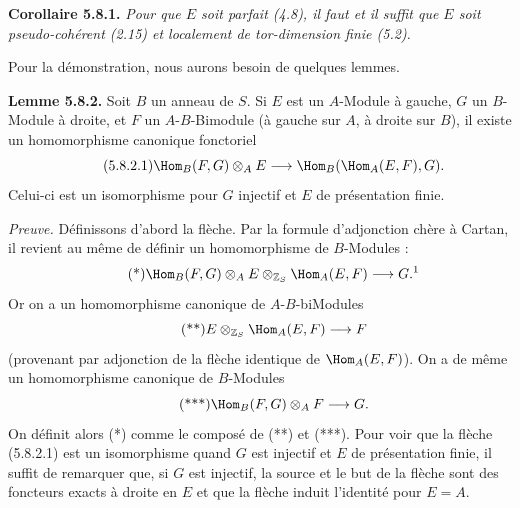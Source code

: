 \textbf{Corollaire 5.8.1.} \emph{Pour que \(E\) soit parfait (4.8), il faut et il suffit que \(E\) soit pseudo-cohérent (2.15) et localement de tor-dimension finie (5.2).}

Pour la démonstration, nous aurons besoin de quelques lemmes.

\textbf{Lemme 5.8.2.} Soit \(B\) un anneau de \(S\). Si \(E\) est un \(A\)-Module à gauche, \(G\) un \(B\)-Module à droite, et \(F\) un \(A\)-\(B\)-Bimodule (à gauche sur \(A\), à droite sur \(B\)), il existe un homomorphisme canonique fonctoriel
\begin{equation}\tag{5.8.2.1}
  \Hom_B(F,G)\otimes_A E
  \longrightarrow
  \Hom_B(\Hom_A(E,F),G).
\end{equation}
Celui-ci est un isomorphisme pour \(G\) injectif et \(E\) de présentation finie.

\emph{Preuve.} Définissons d'abord la flèche. Par la formule d'adjonction chère à Cartan, il revient au même de définir un homomorphisme de \(B\)-Modules :
\begin{equation}\tag{*}
  \Hom_B(F,G)\otimes_A E\otimes_{\mathbb Z_S}\Hom_A(E,F)
  \longrightarrow G.\text{\footnotemark}
\end{equation}
Or on a un homomorphisme canonique de \(A\)-\(B\)-biModules
\begin{equation}\tag{**}
  E\otimes_{\mathbb Z_S}\Hom_A(E,F)
  \longrightarrow F
\end{equation}
(provenant par adjonction de la flèche identique de \(\Hom_A(E,F)\)). On a de même un homomorphisme canonique de \(B\)-Modules
\begin{equation}\tag{***}
  \Hom_B(F,G)\otimes_A F\longrightarrow G.
\end{equation}
On définit alors (*) comme le composé de (**) et (***). Pour voir que la flèche (5.8.2.1) est un isomorphisme quand \(G\) est injectif et \(E\) de présentation finie, il suffit de remarquer que, si \(G\) est injectif, la source et le but de la flèche sont des foncteurs exacts à droite en \(E\) et que la flèche induit l'identité pour \(E=A\).


